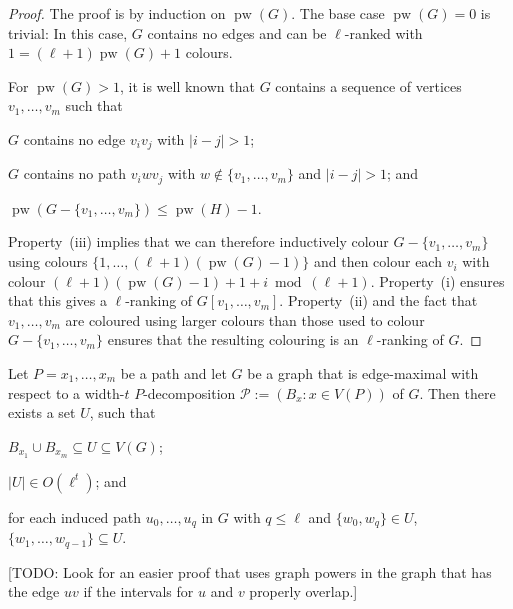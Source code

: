 \documentclass[kpfonts]{patmorin}
\DeclareMathOperator{\pw}{pw}
\theoremstyle{named}
\begin{document}
\begin{proof}
    The proof is by induction on $\pw(G)$.  The base case $\pw(G)=0$ is trivial: In this case, $G$ contains no edges and can be $\ell$-ranked with $1 = (\ell+1)\pw(G)+1$ colours.

    For $\pw(G)>1$, it is well known that $G$ contains a sequence of vertices $v_1,\ldots,v_m$  such that
    \begin{inparaenum}[(i)]
        \item $G$ contains no edge $v_iv_j$ with $|i-j|>1$;
        \item $G$ contains no path $v_iw v_j$ with $w\not\in\{v_1,\ldots,v_m\}$ and $|i-j|>1$; and
        \item $\pw(G-\{v_1,\ldots,v_m\})\le \pw(H)-1$.
    \end{inparaenum}
    Property~(iii) implies that we can therefore inductively colour $G-\{v_1,\ldots,v_m\}$ using colours $\{1,\ldots,(\ell+1)(\pw(G)-1)\}$ and then colour each $v_i$ with colour $(\ell+1)(\pw(G)-1)+1+i\bmod (\ell+1)$.  Property~(i) ensures that this gives a $\ell$-ranking of $G[v_1,\ldots,v_m]$.  Property~(ii) and the fact that $v_1,\ldots,v_m$ are coloured using larger colours than those used to colour $G-\{v_1,\ldots,v_m\}$ ensures that the resulting colouring is an $\ell$-ranking of $G$.
\end{proof}



\begin{lem}\label{path-induced}
    Let $P=x_1,\ldots,x_m$ be a path and let $G$ be a graph that is edge-maximal with respect to a width-$t$ $P$-decomposition $\mathcal{P}:=(B_x:x\in V(P))$ of $G$.  Then there exists a set $U$, such that
    \begin{compactenum}[(Z1)]
        \item $B_{x_1}\cup B_{x_m}\subseteq U \subseteq V(G)$;\label{values-u}
        \item $|U|\in O(\ell^t)$; and \label{size-u}
        \item for each induced path $u_0,\ldots,u_q$ in $G$ with $q\le\ell$ and $\{w_0,w_q\}\in U$,  $\{w_1,\ldots,w_{q-1}\}\subseteq U$.\label{induced-u}
    \end{compactenum}
\end{lem}

[TODO: Look for an easier proof that uses graph powers in the graph that has the edge $uv$ if the intervals for $u$ and $v$ properly overlap.]
\end{document}
